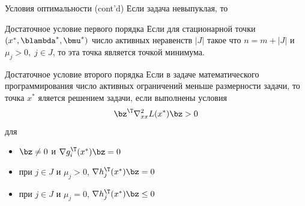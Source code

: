 \documentclass[12pt,russian]{beamer}
\begin{document}
\begin{frame}{Условия оптимальности (cont'd)}
\small
Если задача невыпуклая, то
\begin{block}{Достаточное условие первого порядка}
\small
Если для стационарной точки $(x^*, \blambda^*, \bmu^*)$ число активных неравенств $|J|$ такое что $n = m + |J|$ и $\mu_j > 0, \; j \in J$, то эта точка является точкой минимума.
\end{block}

\begin{block}{Достаточное условие второго порядка}
\small
Если в задаче математического программирования число активных ограничений меньше размерности задачи, то точка $x^*$ яляется решением задачи, если выполнены условия
\vspace{-3mm}
\[
\bz^{\T}\nabla_{xx}^2 L(x^*)\bz > 0
\vspace{-3mm}
\] 
для 
\vspace{-4mm}
\begin{itemize}
\item $\bz \neq 0$ и $\nabla g^{\T}_i(x^*)\bz = 0$
\vspace{-3mm}
\item при $j \in J$ и $\mu_j > 0$, $\nabla h^{\T}_j(x^*) \bz = 0$
\vspace{-3mm}
\item при $j \in J$ и $\mu_j = 0$, $\nabla h^{\T}_j(x^*) \bz \leq 0$
\end{itemize}
\end{block}

\end{frame}
\end{document}
